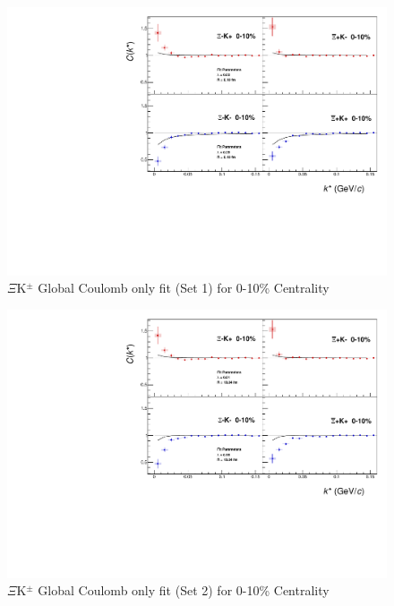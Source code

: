 \documentclass[../AnalysisNoteJBuxton.tex]{subfiles}
\begin{document}
\begin{figure}[h]
  \centering
  \includegraphics[width=\textwidth]{7_ResultsAndDiscussion/Figures/GlobalCoulombOnlyFit_Set1.pdf}
  \caption[$\Xi$K$^{\pm}$ Global Coulomb Only Fit (Set 1)]{$\Xi$K$^{\pm}$ Global Coulomb only fit (Set 1) for 0-10\% Centrality}
  \label{fig:XiKchGlobalCoulombOnlySet1}
\end{figure}

\begin{figure}[h]
  \centering
  \includegraphics[width=\textwidth]{7_ResultsAndDiscussion/Figures/GlobalCoulombOnlyFit_Set2.pdf}
  \caption[$\Xi$K$^{\pm}$ Global Coulomb Only Fit (Set 2)]{$\Xi$K$^{\pm}$ Global Coulomb only fit (Set 2) for 0-10\% Centrality}
  \label{fig:XiKchGlobalCoulombOnlySet2}
\end{figure}
\end{document}
